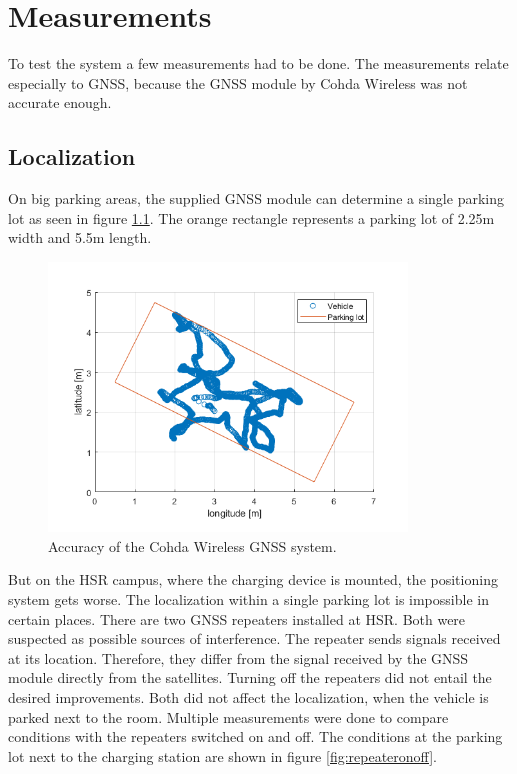 \chapter{Measurements}\label{ch:results}

To test the system a few measurements had to be done. The measurements relate especially to GNSS, because the GNSS module by Cohda Wireless was not accurate enough. 

\section{Localization}

On big parking areas, the supplied GNSS module can determine a single parking lot as seen in figure \ref{fig:ppfitcohda}. The orange rectangle represents a parking lot of 2.25\;m width and 5.5\;m length.

\begin{figure}[htb]
	\centering
	\includegraphics[width=0.85\textwidth]{images/ppfitcohda}
	\caption{Accuracy of the Cohda Wireless GNSS system. }
	\label{fig:ppfitcohda}
\end{figure}

\newpage

But on the HSR campus, where the charging device is mounted, the positioning system gets worse. The localization within a single parking lot is impossible in certain places. There are two GNSS repeaters installed at HSR. Both were suspected as possible sources of interference. The repeater sends signals received at its location. Therefore, they differ from the signal received by the GNSS module directly from the satellites. Turning off the repeaters did not entail the desired improvements. Both did not affect the localization, when the vehicle is parked next to the room. Multiple measurements were done to compare conditions with the repeaters switched on and off. The conditions at the parking lot next to the charging station are shown in figure \ref{fig:repeateronoff}.

